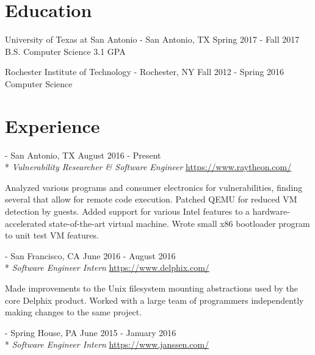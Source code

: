 \documentclass[letterpaper,margin,line,11pt]{resume}
\newcommand{\rurl}[1]{\hfill {\footnotesize \url{#1}}}
\newcommand{\rdate}[1]{\hfill {\small #1}}
\renewcommand{\employer}[5]{\item[#1] - #2 \rdate{#3} \\* #4 \rurl{#5}}
\begin{document}
\begin{resume}
\section{\mysidestyle Education}
    \begin{compactdesc}
        \item[University of Texas at San Antonio] - San Antonio, TX \rdate{Spring 2017 - Fall 2017}
        \small
        \\B.S. Computer Science
        \hfill 3.1 GPA
    \end{compactdesc}
    \begin{compactdesc}
        \item[Rochester Institute of Technology] - Rochester, NY \rdate{Fall 2012 - Spring 2016}
        \small
        \\Computer Science
    \end{compactdesc}

\section{\mysidestyle Experience}
    \begin{asparadesc}
        \employer{Raytheon}{San Antonio, TX} {August 2016 - Present}{\textit{Vulnerability Researcher \& Software Engineer}}{https://www.raytheon.com/}

        \small
	Analyzed various programs and consumer electronics for vulnerabilities, finding several that allow for remote
        code execution. Patched QEMU for reduced VM detection by guests. Added support for various Intel features to a
        hardware-accelerated state-of-the-art virtual machine. Wrote small x86 bootloader program to unit test VM features.
        \normalsize
        \\

        \employer{Delphix}{San Francisco, CA} {June 2016 - August 2016}{\textit{Software Engineer Intern}}{https://www.delphix.com/}

        \small
        Made improvements to the Unix filesystem mounting abstractions used by the core Delphix product. Worked with a
        large team of programmers independently making changes to the same project.
        \normalsize
        \\

        \employer{Janssen Biotech}{Spring House, PA}{June 2015 - January 2016}{\textit{Software Engineer Intern}}{https://www.janssen.com/}


\end{asparadesc}
\end{resume}
\end{document}
